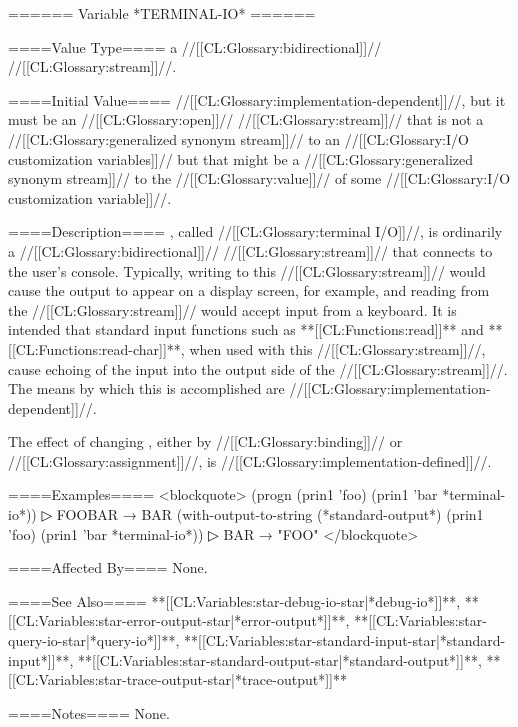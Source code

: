 ====== Variable *TERMINAL-IO* ======

====Value Type====
a //[[CL:Glossary:bidirectional]]// //[[CL:Glossary:stream]]//.

====Initial Value====
//[[CL:Glossary:implementation-dependent]]//, but it must be an //[[CL:Glossary:open]]// //[[CL:Glossary:stream]]// that is not a //[[CL:Glossary:generalized synonym stream]]// to an //[[CL:Glossary:I/O customization variables]]// but that might be a //[[CL:Glossary:generalized synonym stream]]// to the //[[CL:Glossary:value]]// of some //[[CL:Glossary:I/O customization variable]]//.

====Description====
, called //[[CL:Glossary:terminal I/O]]//, is ordinarily a //[[CL:Glossary:bidirectional]]// //[[CL:Glossary:stream]]// that connects to the user's console. Typically, writing to this //[[CL:Glossary:stream]]// would cause the output to appear on a display screen, for example, and reading from the //[[CL:Glossary:stream]]// would accept input from a keyboard. It is intended that standard input functions such as **[[CL:Functions:read]]** and **[[CL:Functions:read-char]]**, when used with this //[[CL:Glossary:stream]]//, cause echoing of the input into the output side of the //[[CL:Glossary:stream]]//. The means by which this is accomplished are //[[CL:Glossary:implementation-dependent]]//.

The effect of changing , either by //[[CL:Glossary:binding]]// or //[[CL:Glossary:assignment]]//, is //[[CL:Glossary:implementation-defined]]//.

====Examples====
<blockquote> (progn (prin1 'foo) (prin1 'bar *terminal-io*))
▷ FOOBAR → BAR (with-output-to-string (*standard-output*) (prin1 'foo) (prin1 'bar *terminal-io*))
▷ BAR → "FOO" </blockquote>

====Affected By====
None.

====See Also====
**[[CL:Variables:star-debug-io-star|*debug-io*]]**, **[[CL:Variables:star-error-output-star|*error-output*]]**, **[[CL:Variables:star-query-io-star|*query-io*]]**, **[[CL:Variables:star-standard-input-star|*standard-input*]]**, **[[CL:Variables:star-standard-output-star|*standard-output*]]**, **[[CL:Variables:star-trace-output-star|*trace-output*]]**

====Notes====
None.

